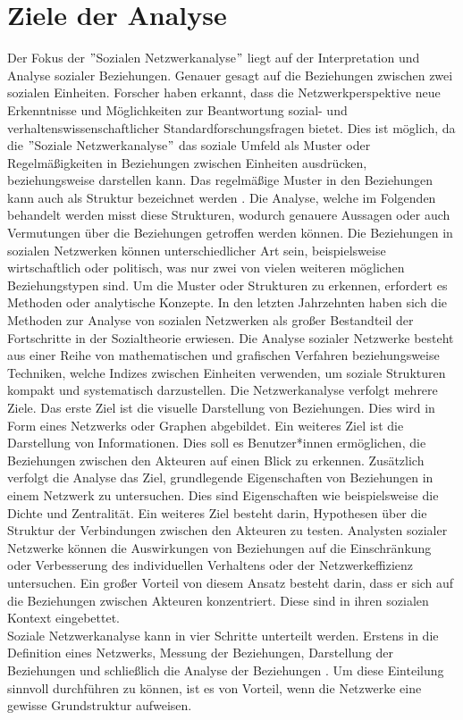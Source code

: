 \section{Ziele der Analyse}
Der Fokus der $"$Sozialen Netzwerkanalyse$"$ liegt auf der Interpretation und Analyse sozialer Beziehungen. Genauer gesagt auf die Beziehungen zwischen zwei sozialen Einheiten. Forscher haben erkannt, dass die Netzwerkperspektive neue Erkenntnisse und Möglichkeiten zur Beantwortung sozial- und verhaltenswissenschaftlicher Standardforschungsfragen bietet. Dies ist möglich, da die $"$Soziale Netzwerkanalyse$"$ das soziale Umfeld als Muster oder Regelmäßigkeiten in Beziehungen zwischen Einheiten ausdrücken, beziehungsweise darstellen kann. Das regelmäßige Muster in den Beziehungen kann auch als Struktur bezeichnet werden \cite{wasserman1994social}. Die Analyse, welche im Folgenden behandelt werden misst diese Strukturen, wodurch genauere Aussagen oder auch Vermutungen über die Beziehungen getroffen werden können. Die Beziehungen in sozialen Netzwerken können unterschiedlicher Art sein, beispielsweise wirtschaftlich oder politisch, was nur zwei von vielen weiteren möglichen Beziehungstypen sind. Um die Muster oder Strukturen zu erkennen, erfordert es Methoden oder analytische Konzepte. In den letzten Jahrzehnten haben sich die Methoden zur Analyse von sozialen Netzwerken als großer Bestandteil der Fortschritte in der Sozialtheorie erwiesen.
Die Analyse sozialer Netzwerke besteht aus einer Reihe von mathematischen und grafischen Verfahren beziehungsweise Techniken, welche Indizes zwischen Einheiten verwenden, um soziale Strukturen kompakt und systematisch darzustellen.
Die Netzwerkanalyse verfolgt mehrere Ziele. Das erste Ziel ist die visuelle Darstellung von Beziehungen. Dies wird in Form eines Netzwerks oder Graphen abgebildet. Ein weiteres Ziel ist die Darstellung von Informationen. Dies soll es Benutzer*innen ermöglichen, die Beziehungen zwischen den Akteuren auf einen Blick zu erkennen. Zusätzlich verfolgt die Analyse das Ziel, grundlegende Eigenschaften von Beziehungen in einem Netzwerk zu untersuchen. Dies sind Eigenschaften wie beispielsweise die Dichte und Zentralität. Ein weiteres Ziel besteht darin, Hypothesen über die Struktur der Verbindungen zwischen den Akteuren zu testen. Analysten sozialer Netzwerke können die Auswirkungen von Beziehungen auf die Einschränkung oder Verbesserung des individuellen Verhaltens oder der Netzwerkeffizienz untersuchen. Ein großer Vorteil von diesem Ansatz besteht darin, dass er sich auf die Beziehungen zwischen Akteuren konzentriert. Diese sind in ihren sozialen Kontext eingebettet.\\
Soziale Netzwerkanalyse kann in vier Schritte unterteilt werden. Erstens in die Definition eines Netzwerks, Messung der Beziehungen, Darstellung der Beziehungen und schließlich die Analyse der Beziehungen \cite{wasserman1994social}. Um diese Einteilung sinnvoll durchführen zu können, ist es von Vorteil, wenn die Netzwerke eine gewisse Grundstruktur aufweisen.


